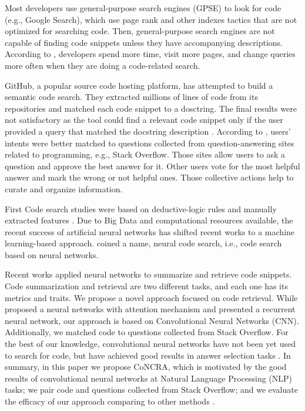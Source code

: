 \documentclass[sigconf]{acmart}
\begin{document}
Most developers use general-purpose search engines (GPSE) to look for code (e.g., Google Search), which use page rank and other indexes tactics that are not optimized for searching code. Then, general-purpose search engines are not capable of finding code snippets unless they have accompanying descriptions. According to \citet{masudur-developers-use-google-code-retrieval:2018}, developers spend more time, visit more pages, and change queries more often when they are doing a code-related search.

GitHub, a popular source code hosting platform, has attempted to build a semantic code search. They extracted millions of lines of code from its repositories and matched each code snippet to a dosctring. The final results were not satisfactory as the tool could find a relevant code snippet only if the user provided a query that matched the docstring description \citep{husain-github-semantic-search-code-2019}. According to \citet{cambronero-deep-code-search-2019}, users' intents were better matched to questions collected from question-answering sites related to programming, e.g., Stack Overflow. Those sites allow users to ask a question and approve the best answer for it. Other users vote for the most helpful answer and mark the wrong or not helpful ones. Those collective actions help to curate and organize information.

First Code search studies were based on deductive-logic rules and manually extracted features \cite{Allamanis:2018:SML}. Due to Big Data and computational resources available, the recent success of artificial neural networks has shifted recent works to a machine learning-based approach. \citet{cambronero-deep-code-search-2019} coined a name, neural code search, i.e., code search based on neural networks.

Recent works applied neural networks to summarize and retrieve code snippets. Code summarization and retrieval are two different tasks, and each one has its metrics and traits. We propose a novel approach focused on code retrieval. While \citet{cambronero-deep-code-search-2019} proposed a neural networks with attention mechanism and \citet{Gu-deep-code-search:2018} presented a recurrent neural network, our approach is based on Convolutional Neural Networks (CNN). Additionally, we matched code to questions collected from Stack Overflow. For the best of our knowledge, convolutional neural networks have not been yet used to search for code, but have achieved good results in answer selection tasks \citep{feng-2015, wen-joint-modeling-question-answer-2019}. In summary, in this paper we propose CoNCRA, which is motivated by the good results of convolutional neural networks at Natural Language Processing (NLP) tasks; we pair code and questions collected from Stack Overflow; and we evaluate the efficacy of our approach comparing to other methods .
\end{document}
